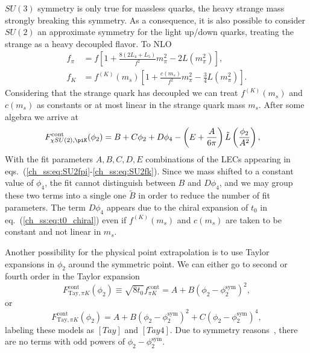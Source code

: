 $SU(3)$ symmetry is only true for massless quarks, the heavy strange mass strongly breaking this symmetry. As a consequence, it is also possible to consider $SU(2)$ an approximate symmetry for the light up/down quarks, treating the strange as a heavy decoupled flavor. To NLO~\citep{SU2}
\begin{align}
\label{ch_ss:eq:SU2fpi}
f_{\pi}&=f\left[1+\frac{8(2L_4+L_5)}{f^2}m_{\pi}^2-2L(m_{\pi}^2)\right], \\
\label{ch_ss:eq:SU2fk}
f_K&=f^{(K)}(m_s)\left[1+\frac{c(m_s)}{f^2}m_{\pi}^2-\frac{3}{4}L(m_{\pi}^2)\right].
\end{align}
Considering that the strange quark has decoupled we can treat $f^{(K)}(m_s)$ and $c(m_s)$ as constants or at most linear in the strange quark mass $m_s$. After some algebra we arrive at
\begin{align}
\label{ch_ss:eq:SU2pik}
F_{\chi SU(2),\piK}^{\textrm{cont}}(\phi_2)&=B+C\phi_2+D\phi_4-\left(E+\frac{A}{6\pi}\right)\tilde{L}\left(\frac{\phi_2}{A^2}\right),
\end{align}
With the fit parameters $A,B,C,D,E$ combinations of the LECs appearing in eqs.~(\ref{ch_ss:eq:SU2fpi}-\ref{ch_ss:eq:SU2fk}). Since we mass shifted to a constant value of $\phi_4$, the fit cannot distinguish between $B$ and $D\phi_4$, and we may group these two terms into a single one $\tilde{B}$ in order to reduce the number of fit parameters. The term $D\phi_4$ appears due to the chiral expansion of $t_0$ in eq.~(\ref{ch_ss:eq:t0_chiral}) even if $f^{(K)}(m_s)$ and $c(m_s)$ are taken to be constant and not linear in $m_s$.

Another possibility for the physical point extrapolation is to use Taylor expansions in $\phi_2$ around the symmetric point. We can either go to second or fourth order in the Taylor expansion
\begin{equation}
\label{ch_ss:eq:Tay}
F_{\textrm{Tay},\pi K}^{\textrm{cont}}(\phi_2)\equiv\sqrt{8t_0}f_{\pi K}^{\textrm{cont}}=A+B\left(\phi_2-\phi_2^{\textrm{sym}}\right)^2,
\end{equation}
or
\begin{equation}
\label{ch_ss:eq:Tay4}
F_{\textrm{Tay},\pi K}^{\textrm{cont}}(\phi_2)=A+B\left(\phi_2-\phi_2^{\textrm{sym}}\right)^2+C\left(\phi_2-\phi_2^{\textrm{sym}}\right)^4,
\end{equation}
labeling these models as $[Tay]$ and $[Tay4]$. Due to symmetry reasons~\citep{Bietenholz:2011qq}, there are no terms with odd powers of $\phi_2-\phi_2^{\textrm{sym}}$.

